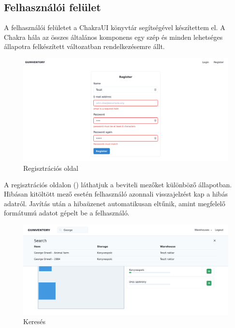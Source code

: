
\subsection{Felhasználói felület}
A felhasználói felületet a ChakraUI könyvtár segítségével készítettem el.
A Chakra hála az összes általános komponens egy szép és minden lehetséges állapotra felkészített változatban rendelkezésemre állt.

\begin{figure}[!ht]
  \centering
  \includegraphics[width=150mm, keepaspectratio]{figures/reg.png}
  \caption{Regisztrációs oldal}
  \label{fig:reg}
\end{figure}

A regisztrációs oldalon () láthatjuk a beviteli mezőket különböző állapotban.
Hibásan kitöltött mező esetén felhasználó azonnali visszajelzést kap a hibás adatról.
Javítás után a hibaüzenet automatikusan eltűnik, amint megfelelő formátumú adatot gépelt be a felhasználó.

\begin{figure}[!ht]
  \centering
  \includegraphics[width=150mm, keepaspectratio]{figures/search.png}
  \caption{Keresés}
  \label{fig:search}
\end{figure}


